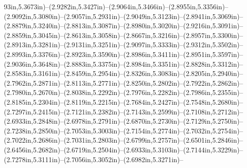 93in,5.3673in)--(2.9282in,5.3427in)--(2.9064in,5.3466in)--(2.8955in,5.3356in)--(2.9092in,5.3080in)--(2.9057in,5.2931in)--(2.9049in,5.3123in)--(2.8941in,5.3069in)--(2.8879in,5.3240in)--(2.8813in,5.3087in)--(2.8980in,5.3020in)--(2.9216in,5.3091in)--(2.8859in,5.3045in)--(2.8613in,5.3058in)--(2.8667in,5.3216in)--(2.8957in,5.3300in)--(2.8913in,5.3281in)--(2.9131in,5.3251in)--(2.9097in,5.3333in)--(2.9312in,5.3502in)--(2.8993in,5.3376in)--(2.8923in,5.3590in)--(2.8986in,5.3411in)--(2.8951in,5.3597in)--(2.9036in,5.3648in)--(2.8883in,5.3375in)--(2.8984in,5.3351in)--(2.8828in,5.3312in)--(2.8583in,5.3161in)--(2.8459in,5.2954in)--(2.8326in,5.3083in)--(2.8205in,5.2940in)--(2.7962in,5.2871in)--(2.8113in,5.2771in)--(2.8250in,5.2802in)--(2.7922in,5.2862in)--(2.7980in,5.2670in)--(2.8038in,5.2292in)--(2.7976in,5.2282in)--(2.7986in,5.2355in)--(2.8185in,5.2304in)--(2.8119in,5.2215in)--(2.7684in,5.2427in)--(2.7548in,5.2680in)--(2.7297in,5.2415in)--(2.7121in,5.2382in)--(2.7143in,5.2599in)--(2.7108in,5.2712in)--(2.6933in,5.2848in)--(2.6978in,5.2791in)--(2.6870in,5.2730in)--(2.7129in,5.2750in)--(2.7238in,5.2850in)--(2.7053in,5.3003in)--(2.7154in,5.2774in)--(2.7032in,5.2754in)--(2.7022in,5.2686in)--(2.7031in,5.2803in)--(2.6799in,5.2757in)--(2.6501in,5.2846in)--(2.6456in,5.2682in)--(2.6719in,5.2504in)--(2.6933in,5.3103in)--(2.7144in,5.3229in)--(2.7278in,5.3111in)--(2.7056in,5.3052in)--(2.6982in,5.3271in)--
